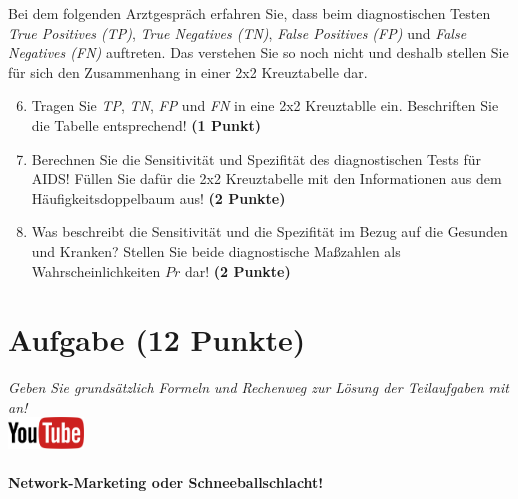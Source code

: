 \documentclass[a4paper, 9pt]{scrartcl}\usepackage[]{graphicx}\usepackage[]{xcolor}
\begin{document}
Bei dem folgenden Arztgespr{\"a}ch erfahren Sie, dass beim diagnostischen
Testen \textit{True Positives (TP)}, \textit{True Negatives (TN)},
\textit{False Positives (FP)} und \textit{False Negatives (FN)}
auftreten. Das verstehen Sie so noch nicht und deshalb stellen Sie f{\"u}r sich
den Zusammenhang in einer 2x2 Kreuztabelle dar.

\begin{enumerate}
  \setcounter{enumi}{5}
\item Tragen Sie \textit{TP}, \textit{TN}, \textit{FP} und \textit{FN} in
  eine 2x2 Kreuztablle ein. Beschriften Sie die Tabelle entsprechend!
  \textbf{(1 Punkt)}
\item Berechnen Sie die Sensitivit{\"a}t und Spezifit{\"a}t des diagnostischen Tests
  f{\"u}r AIDS! F{\"u}llen Sie daf{\"u}r die 2x2 Kreuztabelle mit den Informationen aus
  dem H{\"a}ufigkeitsdoppelbaum aus! \textbf{(2 Punkte)}
\item Was beschreibt die Sensitivit{\"a}t und die Spezifit{\"a}t im Bezug auf die
  Gesunden und Kranken? Stellen Sie beide diagnostische Ma{\ss}zahlen als
  Wahrscheinlichkeiten $Pr$ dar! \textbf{(2 Punkte)} 
\end{enumerate}



 
\clearpage

\section{Aufgabe \hfill (12 Punkte)}

\textit{Geben Sie grunds{\"a}tzlich Formeln und Rechenweg zur L{\"o}sung der
  Teilaufgaben mit an!} \\[1Ex]

\hfill\href{https://youtu.be/SZqp_vy3rgI}{\includegraphics[width = 2cm]{img/youtube}} %
\hspace{2Ex}

\paragraph{Network-Marketing oder Schneeballschlacht!}
\end{document}
